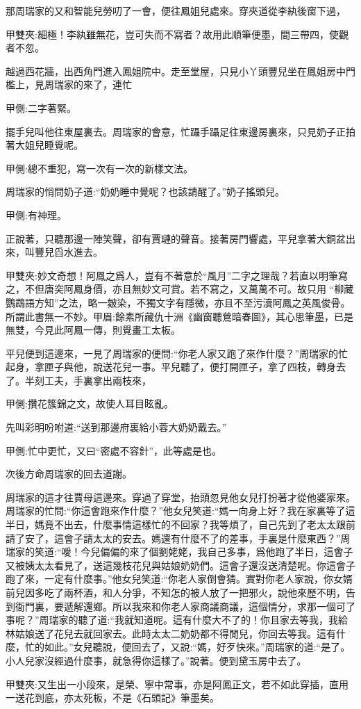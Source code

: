\begin{parag}
    那周瑞家的又和智能兒勞叨了一會，便往鳳姐兒處來。穿夾道從李紈後窗下過，\begin{note}甲雙夾:細極！李紈雖無花，豈可失而不寫者？故用此順筆便墨，間三帶四，使觀者不忽。\end{note}越過西花牆，出西角門進入鳳姐院中。走至堂屋，只見小丫頭豐兒坐在鳳姐房中門檻上，見周瑞家的來了，連忙\begin{note}甲側:二字著緊。\end{note}擺手兒叫他往東屋裏去。周瑞家的會意，忙躡手躡足往東邊房裏來，只見奶子正拍著大姐兒睡覺呢。\begin{note}甲側:總不重犯，寫一次有一次的新樣文法。\end{note}周瑞家的悄問奶子道:“奶奶睡中覺呢？也該請醒了。”奶子搖頭兒。\begin{note}甲側:有神理。\end{note}正說著，只聽那邊一陣笑聲，卻有賈璉的聲音。接著房門響處，平兒拿著大銅盆出來，叫豐兒舀水進去。\begin{note}甲雙夾:妙文奇想！阿鳳之爲人，豈有不著意於“風月”二字之理哉？若直以明筆寫之，不但唐突阿鳳身價，亦且無妙文可賞。若不寫之，又萬萬不可。故只用 “柳藏鸚鵡語方知”之法，略一皴染，不獨文字有隱微，亦且不至污瀆阿鳳之英風俊骨。所謂此書無一不妙。甲眉:餘素所藏仇十洲《幽窗聽鶯暗春圖》，其心思筆墨，已是無雙，今見此阿鳳一傳，則覺畫工太板。\end{note}平兒便到這邊來，一見了周瑞家的便問:“你老人家又跑了來作什麼？”周瑞家的忙起身，拿匣子與他，說送花兒一事。平兒聽了，便打開匣子，拿了四枝，轉身去了。半刻工夫，手裏拿出兩枝來，\begin{note}甲側:攢花簇錦之文，故使人耳目眩亂。\end{note}先叫彩明吩咐道:“送到那邊府裏給小蓉大奶奶戴去。”\begin{note}甲側:忙中更忙，又曰“密處不容針”，此等處是也。\end{note}次後方命周瑞家的回去道謝。
\end{parag}


\begin{parag}
    周瑞家的這才往賈母這邊來。穿過了穿堂，抬頭忽見他女兒打扮著才從他婆家來。周瑞家的忙問:“你這會跑來作什麼？”他女兒笑道:“媽一向身上好？我在家裏等了這半日，媽竟不出去，什麼事情這樣忙的不回家？我等煩了，自己先到了老太太跟前請了安了，這會子請太太的安去。媽還有什麼不了的差事，手裏是什麼東西？”周瑞家的笑道:“噯！今兒偏偏的來了個劉姥姥，我自己多事，爲他跑了半日，這會子又被姨太太看見了，送這幾枝花兒與姑娘奶奶們。這會子還沒送清楚呢。你這會子跑了來，一定有什麼事。”他女兒笑道:“你老人家倒會猜。實對你老人家說，你女婿前兒因多吃了兩杯酒，和人分爭，不知怎的被人放了一把邪火，說他來歷不明，告到衙門裏，要遞解還鄉。所以我來和你老人家商議商議，這個情分，求那一個可了事呢？”周瑞家的聽了道:“我就知道呢。這有什麼大不了的！你且家去等我，我給林姑娘送了花兒去就回家去。此時太太二奶奶都不得閒兒，你回去等我。這有什麼，忙的如此。”女兒聽說，便回去了，又說:“媽，好歹快來。”周瑞家的道:“是了。小人兒家沒經過什麼事，就急得你這樣了。”說著。便到黛玉房中去了。\begin{note}甲雙夾:又生出一小段來，是榮、寧中常事，亦是阿鳳正文，若不如此穿插，直用一送花到底，亦太死板，不是《石頭記》筆墨矣。\end{note}
\end{parag}


